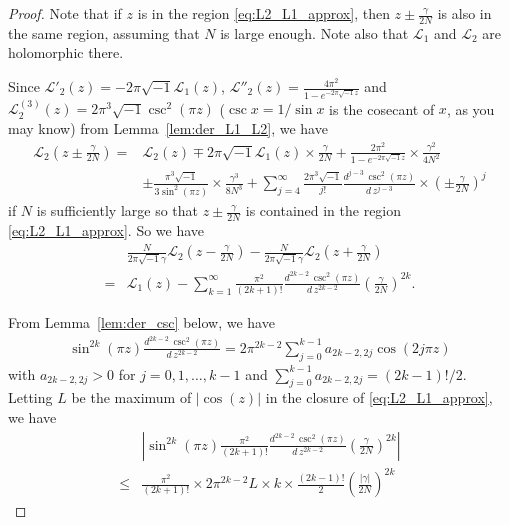 \documentclass[a4paper,dvipdfmx]{amsart}
\theoremstyle{plain}
\theoremstyle{definition}
\theoremstyle{remark}
\renewcommand{\L}{\mathcal{L}}
\renewcommand{\i}{\sqrt{-1}}
\numberwithin{equation}{section}
\begin{document}
\begin{proof}
Note that if $z$ is in the region \eqref{eq:L2_L1_approx}, then $z\pm\frac{\gamma}{2N}$ is also in the same region, assuming that  $N$ is large enough.
Note also that $\L_1$ and $\L_2$ are holomorphic there.
\par
Since $\L'_2(z)=-2\pi\i\L_1(z)$, $\L''_2(z)=\frac{4\pi^2}{1-e^{-2\pi\i z}}$ and $\L^{(3)}_2(z)=2\pi^3\i\csc^2(\pi z)$ ($\csc{x}=1/\sin{x}$ is the cosecant of $x$, as you may know) from Lemma~\ref{lem:der_L1_L2}, we have
\begin{align*}
  \L_2\left(z\pm\frac{\gamma}{2N}\right)
  =&
  \L_2(z)
  \mp
  2\pi\i\L_1(z)\times\frac{\gamma}{2N}
  +
  \frac{2\pi^2}{1-e^{-2\pi\i z}}\times\frac{\gamma^2}{4N^2}
  \\
  &\pm
  \frac{\pi^3\i}{3\sin^2(\pi z)}\times\frac{\gamma^3}{8N^3}
  +
  \sum_{j=4}^{\infty}\frac{2\pi^3\i}{j!}\frac{d^{j-3}\,\csc^2(\pi z)}{d\,z^{j-3}}
  \times\left(\pm\frac{\gamma}{2N}\right)^{j}
\end{align*}
if $N$ is sufficiently large so that $z\pm\frac{\gamma}{2N}$ is contained in the region \eqref{eq:L2_L1_approx}.
So we have
\begin{equation}\label{eq:L2_L1_gamma_csc}
\begin{split}
  &\frac{N}{2\pi\i\gamma}\L_2\left(z-\frac{\gamma}{2N}\right)
  -
  \frac{N}{2\pi\i\gamma}\L_2\left(z+\frac{\gamma}{2N}\right)
  \\
  =&
  \L_1(z)
  -
  \sum_{k=1}^{\infty}\frac{\pi^2}{(2k+1)!}\frac{d^{2k-2}\,\csc^2(\pi z)}{d\,z^{2k-2}}
  \left(\frac{\gamma}{2N}\right)^{2k}.
\end{split}
\end{equation}
\par
From Lemma~\ref{lem:der_csc} below, we have
\begin{align*}
  \sin^{2k}(\pi z)\frac{d^{2k-2}\,\csc^2(\pi z)}{d\,z^{2k-2}}
  =
  2\pi^{2k-2}\sum_{j=0}^{k-1}a_{2k-2,2j}\cos(2j\pi z)
\end{align*}
with $a_{2k-2,2j}>0$ for $j=0,1,\dots,k-1$ and $\sum_{j=0}^{k-1}a_{2k-2,2j}=(2k-1)!/2$.
Letting $L$ be the maximum of $|\cos(z)|$ in the closure of \eqref{eq:L2_L1_approx}, we have
\begin{align*}
  &\left|
    \sin^{2k}(\pi z)
    \frac{\pi^2}{(2k+1)!}\frac{d^{2k-2}\,\csc^2(\pi z)}{d\,z^{2k-2}}
    \left(\frac{\gamma}{2N}\right)^{2k}
  \right|
  \\
  \le&
  \frac{\pi^2}{(2k+1)!}\times
  2\pi^{2k-2} L
  \times k\times\frac{(2k-1)!}{2}
  \left(\frac{|\gamma|}{2N}\right)^{2k}

\end{align*}
\end{proof}
\end{document}
